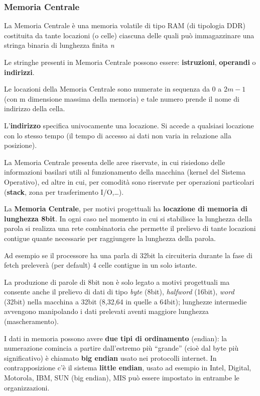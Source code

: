 \documentclass[12pt]{article} %
\begin{document}
\subsubsection{Memoria Centrale}
La Memoria Centrale è una memoria volatile di tipo RAM (di tipologia DDR) costituita da tante locazioni (o celle) ciascuna delle quali può immagazzinare una stringa binaria di lunghezza finita \textit{n}\par\medskip\noindent
Le stringhe presenti in Memoria Centrale possono essere: \textbf{istruzioni}, \textbf{operandi} o \textbf{indirizzi}. \par\medskip\noindent
Le locazioni della Memoria Centrale sono numerate in sequenza da 0 a \(2m-1\) (con m dimensione massima della memoria) e tale numero prende il nome di indirizzo della cella.\par\medskip\noindent 
\par\medskip\noindent L’\textbf{indirizzo} specifica univocamente una locazione. Si accede a qualsiasi locazione con lo stesso tempo (il tempo di accesso ai dati non varia in relazione alla posizione).\par\medskip\noindent
La Memoria Centrale presenta delle aree riservate, in cui risiedono delle informazioni basilari utili al funzionamento della macchina (kernel del Sistema Operativo), ed altre in cui, per comodità sono riservate per operazioni particolari (\textbf{stack}, zona per trasferimento I/O,…).\par\medskip\noindent
La \textbf{Memoria Centrale}, per motivi progettuali ha \textbf{locazione di memoria di lunghezza 8bit}. In ogni caso nel momento in cui si stabilisce la lunghezza della parola si realizza una rete combinatoria che permette il prelievo di tante locazioni contigue quante necessarie per raggiungere la lunghezza della parola.\par\medskip\noindent
Ad esempio se il processore ha una parla di 32bit la circuiteria durante la fase di fetch preleverà (per default) 4 celle contigue in un solo istante.\par\medskip\noindent
La produzione di parole di 8bit non è solo legato a motivi progettuali ma consente anche il prelievo di dati di tipo \textit{byte} (8bit), \textit{halfword} (16bit), \textit{word} (32bit) nella macchina a 32bit (8,32,64 in quelle a 64bit); lunghezze intermedie avvengono manipolando i dati prelevati aventi maggiore lunghezza (mascheramento).\par\medskip\noindent
I dati in memoria possono avere \textbf{due tipi di ordinamento }(endian): la numerazione comincia a partire dall’estremo più “grande” (cioè dal byte più significativo) è chiamato \textbf{big endian} usato nei protocolli internet. In contrapposizione c’è il sistema \textbf{little endian}, usato ad esempio in Intel, Digital, Motorola, IBM, SUN (big endian), MIS può essere impostato in entrambe le organizzazioni.\par\medskip\noindent
\end{document}
